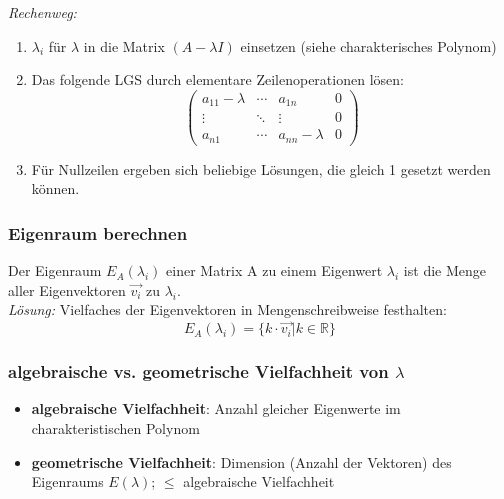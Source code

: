 \textit{Rechenweg:}

\begin{enumerate}
    \item \(\lambda_i\) für \(\lambda\) in die Matrix \((A-\lambda I)\) einsetzen (siehe charakterisches Polynom)
    \item Das folgende LGS durch elementare Zeilenoperationen lösen:\\
        \begin{equation*}
            \left( 
            \begin{array}{ccc|c}
                a_{11} - \lambda & \cdots & a_{1n} & 0\\
                \vdots & \ddots & \vdots & 0\\
                a_{n1} & \cdots & a_{nn} - \lambda & 0
            \end{array}
            \right)
        \end{equation*}
    \item Für Nullzeilen ergeben sich beliebige Lösungen, die gleich 1 gesetzt werden können.
\end{enumerate}


\subsubsection{Eigenraum berechnen}

Der Eigenraum \(E_A(\lambda_i)\) einer Matrix A zu einem Eigenwert \(\lambda_i\) ist die Menge aller Eigenvektoren \(\vec{v_i}\) zu \(\lambda_i\).\\

\textit{Lösung:}
Vielfaches der Eigenvektoren in Mengenschreibweise festhalten:\\

\begin{equation*}
    E_A(\lambda_i) = \{ k \cdot \vec{v_i} | k \in \mathbb{R} \}   
\end{equation*}

\subsubsection{algebraische vs. geometrische Vielfachheit von \(\lambda\)}
\begin{itemize}
    \item \textbf{algebraische Vielfachheit}: Anzahl gleicher Eigenwerte im charakteristischen Polynom
    \item \textbf{geometrische Vielfachheit}: Dimension (Anzahl der Vektoren) des Eigenraums \(E(\lambda)\); \(\leq\) algebraische Vielfachheit
\end{itemize}